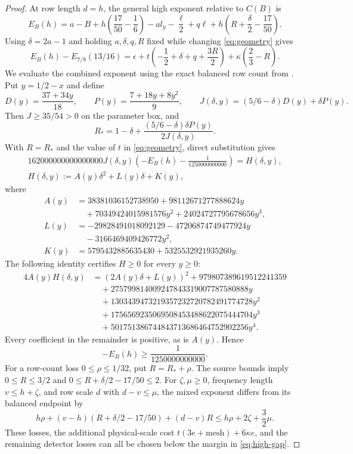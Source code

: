 \documentclass[11pt]{article}
\begin{document}
\begin{proof}
At row length $d=h$, the general high exponent relative to $C(B)$ is
\begin{equation}\label{eq:high-exponent}
 E_B(h)=a-B+h\left(\frac{17}{50}-\frac16\right)
       -a l_y-\frac\ell2+q\ell
       +h\left(R+\frac\delta2-\frac{17}{50}\right).
\end{equation}
Using $\delta=2a-1$ and holding $a,\delta,q,R$ fixed while changing
\eqref{eq:geometry} gives
\begin{equation}\label{eq:perturbation}
 E_B(h)-E_{7/8}(13/16)
 =\epsilon+t\left(-\frac12+\delta+q+\frac{3R}{2}\right)
       +\kappa\left(\frac23-R\right).
\end{equation}
We evaluate the combined exponent using the exact balanced row count
from \cite[Part II, compensated endpoint certificate]{OAI}. Put
$y=1/2-x$ and define
\[
 D(y)=\frac{37+34y}{18},\qquad
 P(y)=\frac{7+18y+8y^2}{9},\qquad
 J(\delta,y)=(5/6-\delta)D(y)+\delta P(y).
\]
Then $J\ge35/54>0$ on the parameter box, and
\[
 R_*=1-\delta+\frac{(5/6-\delta)\delta P(y)}{2J(\delta,y)}.
\]
With $R=R_*$ and the value of $t$ in \eqref{eq:geometry}, direct substitution gives
\[
 \begin{gathered}
 162000000000000000J(\delta,y)
   \left(-E_B(h)-\frac1{1250000000000}\right)
 =H(\delta,y),\\
 H(\delta,y):=A(y)\delta^2+L(y)\delta+K(y),
 \end{gathered}
\]
where
\begin{align*}
 A(y)&=38381036152738950+98112671277888624y\\
     &\quad+70349424015981576y^2+24024727795678656y^3,\\
 L(y)&=-29828491018092129-47206874749477924y\\
     &\quad-3166469409426772y^2,\\
 K(y)&=5795432885635430+5325532921935260y.
\end{align*}
The following identity certifies $H\ge0$ for every $y\ge0$:
\begin{align*}
 4A(y)H(\delta,y)
 &=(2A(y)\delta+L(y))^2+979807389619512241359\\
 &\quad+275799814009247843319007787580888y\\
 &\quad+1303439473219357232720782491774728y^2\\
 &\quad+1756569235069508453488622075444704y^3\\
 &\quad+501751386744843713686464752902256y^4.
\end{align*}
Every coefficient in the remainder is positive, as is $A(y)$. Hence
\begin{equation}\label{eq:high-gap}
 -E_B(h)\ge\frac1{1250000000000}.
\end{equation}
For a row-count loss $0\le\rho\le1/32$, put $R=R_*+\rho$.
The source bounds imply
$0\le R\le3/2$ and $0\le R+\delta/2-17/50\le2$.
For $\zeta,\mu\ge0$, frequency length $v\le h+\zeta$, and row scale $d$
with $d-v\le\mu$, the mixed exponent differs from its balanced endpoint by
\[
 h\rho+(v-h)(R+\delta/2-17/50)+(d-v)R
 \le h\rho+2\zeta+\frac32\mu.
\]
These losses, the additional physical-scale cost
$t(3e+\mathrm{mesh})+6\kappa e$,
and the remaining detector losses can all be chosen below the margin
in \eqref{eq:high-gap}.


\end{proof}
\end{document}
